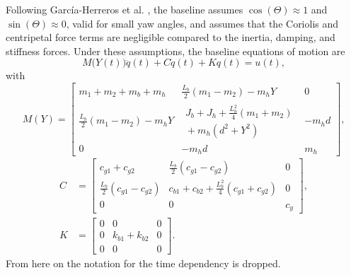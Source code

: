 Following Garc\'ia-Herreros et al. \cite{garcia2013model}, the baseline assumes $\cos(\Theta)\approx1$ and $\sin(\Theta)\approx0$, 
valid for small yaw angles, and assumes that the Coriolis and centripetal force terms are
negligible compared to the inertia, damping, and stiffness forces.
Under these assumptions, the baseline equations of motion are
\begin{equation}
  M\bigl(Y(t)\bigr)\ddot{q}(t) + C\dot{q}(t) + K q(t) = u(t),
  \label{eq:eom}
\end{equation}
with
{\footnotesize
\setlength{\arraycolsep}{3pt}
\begin{equation}
M(Y)=
\begin{bmatrix}
m_1+m_2+m_b+m_h & \tfrac{L_b}{2}(m_1-m_2)-m_hY & 0\\
\tfrac{L_b}{2}(m_1-m_2)-m_hY &
\substack{J_b+J_h+\tfrac{L_b^2}{4}(m_1+m_2)\\{}+m_h(d^2+Y^2)} & -m_hd\\
0 & -m_hd & m_h
\end{bmatrix},
\label{eq:mass_matrix}
\end{equation}
\begin{equation}
\begin{aligned}
C&=
\begin{bmatrix}
c_{g1}+c_{g2} & \tfrac{L_b}{2}(c_{g1}-c_{g2}) & 0\\
\tfrac{L_b}{2}(c_{g1}-c_{g2}) &
c_{b1}+c_{b2}+\tfrac{L_b^2}{4}(c_{g1}+c_{g2}) & 0\\
0 & 0 & c_y
\end{bmatrix},\\[1ex]
K&=
\begin{bmatrix}
0&0&0\\
0&k_{b1}+k_{b2}&0\\
0&0&0
\end{bmatrix}.
\end{aligned}
\label{eq:damping_stiffness_matrices}
\end{equation}
}
From here on the notation for the time dependency is dropped.
